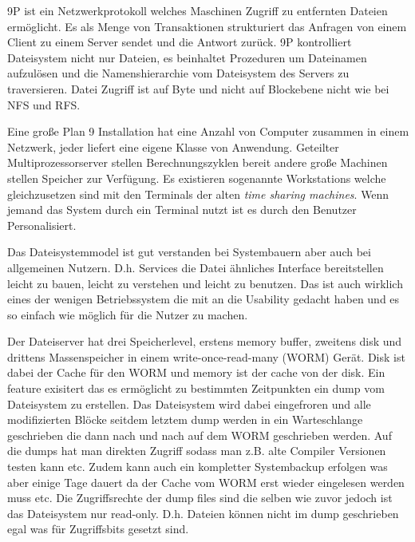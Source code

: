 \documentclass[9pt,technote]{IEEEtran}
\begin{document}
        9P ist ein Netzwerkprotokoll welches Maschinen Zugriff zu entfernten Dateien erm\"oglicht.
        Es als Menge von Transaktionen strukturiert das Anfragen von einem Client zu einem Server sendet und die Antwort zur\"uck.
        9P kontrolliert Dateisystem nicht nur Dateien,
        es beinhaltet Prozeduren um Dateinamen aufzul\"osen und die Namenshierarchie vom Dateisystem des Servers zu traversieren.
        Datei Zugriff ist auf Byte und nicht auf Blockebene nicht wie bei NFS und RFS.
        
        Eine gro\ss e Plan 9 Installation hat eine Anzahl von Computer zusammen in einem Netzwerk, jeder liefert eine eigene Klasse von Anwendung.
        Geteilter Multiprozessorserver stellen
        Berechnungszyklen bereit andere gro\ss e Machinen stellen Speicher zur Verf\"ugung. Es existieren sogenannte Workstations welche gleichzusetzen sind mit den 
        Terminals der alten \textit{time sharing machines}. Wenn jemand das System durch ein Terminal nutzt ist es durch den Benutzer Personalisiert.
    
        Das Dateisystemmodel ist gut verstanden bei Systembauern aber auch bei allgemeinen Nutzern. 
        D.h. Services die Datei \"ahnliches Interface bereitstellen leicht zu bauen, leicht zu verstehen
        und leicht zu benutzen. Das ist auch wirklich eines der wenigen Betriebssystem die mit an die Usability 
        gedacht haben und es so einfach wie m\"oglich f\"ur die Nutzer zu machen.
        
        Der Dateiserver hat drei Speicherlevel, erstens memory buffer, zweitens disk und drittens Massenspeicher in einem write-once-read-many (WORM) Ger\"at. 
        Disk ist dabei der Cache f\"ur den WORM und memory ist der cache von der disk.
        Ein feature exisitert das es erm\"oglicht zu bestimmten Zeitpunkten ein dump vom
        Dateisystem zu erstellen. Das Dateisystem wird dabei eingefroren und alle modifizierten Bl\"ocke seitdem letztem dump werden in ein Warteschlange geschrieben
        die dann nach und nach auf dem WORM geschrieben werden. Auf die dumps hat man direkten Zugriff sodass man z.B.  alte Compiler Versionen testen kann etc.
        Zudem kann auch ein kompletter Systembackup erfolgen was aber einige Tage dauert da der Cache vom WORM erst wieder eingelesen werden muss etc.
        Die Zugriffsrechte der dump files sind die selben wie zuvor jedoch ist das Dateisystem nur read-only. D.h. Dateien k\"onnen nicht im dump geschrieben egal
        was f\"ur Zugriffsbits gesetzt sind.
        
\end{document}

